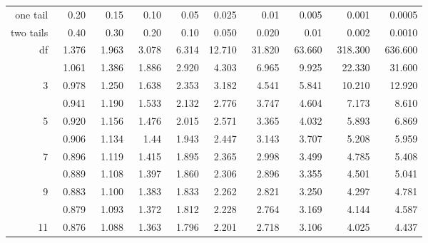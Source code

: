 \begin{center}
\begin{tabular}{r | rrr rr rrrr}
\hline
one tail & \hspace{1.5mm}  0.20  &   0.15  &   0.10  &   0.05  &   0.025 &   0.01  &   0.005 &   0.001 &   0.0005 \\
two tails & \hspace{1.5mm}  0.40  &   0.30  &   0.20  &   0.10  &   0.050 &   0.020  &   0.01 &   0.002 &   0.0010\\
\hline
df \quad  1	&	~1.376	&	~1.963	&	~3.078	&	~6.314	&	12.710	&	~31.820	&	~63.660	&	~318.300&   ~636.600\\
\gray   2	&	~1.061	&	~1.386	&	~1.886	&	~2.920	&	~4.303	&	~6.965	&	~9.925	&	~22.330	&	~31.600	\\
        3	&	~0.978	&	~1.250	&	~1.638	&	~2.353	&	~3.182	&	~4.541	&	~5.841	&	~10.210	&	~12.920	\\
\gray   4	&	~0.941	&	~1.190	&	~1.533	&	~2.132	&	~2.776	&	~3.747	&	~4.604	&	~7.173	&	~8.610	\\
        5	&	~0.920	&	~1.156	&	~1.476	&	~2.015	&	~2.571	&	~3.365	&	~4.032	&	~5.893	&	~6.869	\\
\hline
\gray   6	&	~0.906	&	~1.134	&	~1.44	&	~1.943	&	~2.447	&	~3.143	&	~3.707	&	~5.208	&	~5.959	\\
        7	&	~0.896	&	~1.119	&	~1.415	&	~1.895	&	~2.365	&	~2.998	&	~3.499	&	~4.785	&	~5.408	\\
\gray   8	&	~0.889	&	~1.108	&	~1.397	&	~1.860	&	~2.306	&	~2.896	&	~3.355	&	~4.501	&	~5.041	\\
        9	&	~0.883	&	~1.100	&	~1.383	&	~1.833	&	~2.262	&	~2.821	&	~3.250	&	~4.297	&	~4.781	\\
\gray   10	&	~0.879	&	~1.093	&	~1.372	&	~1.812	&	~2.228	&	~2.764	&	~3.169	&	~4.144	&	~4.587	\\
\hline
\hline
        11	&	~0.876	&	~1.088	&	~1.363	&	~1.796	&	~2.201	&	~2.718	&	~3.106	&	~4.025	&	~4.437	\\

\end{tabular}
\end{center}
